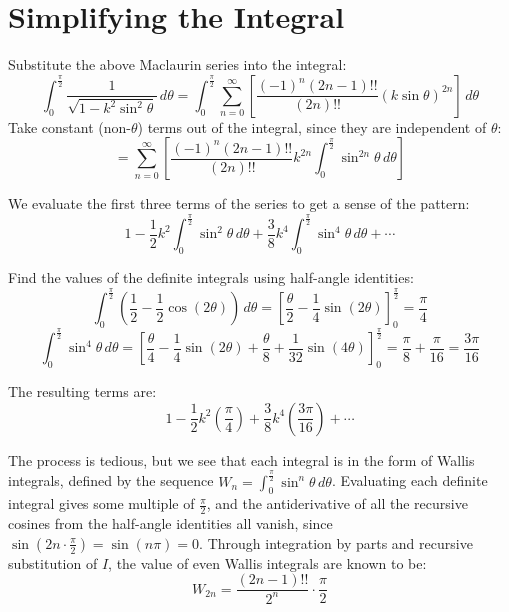 \documentclass[12pt]{article}
\begin{document}
\section{Simplifying the Integral}

Substitute the above Maclaurin series into the integral:
\[
  \int_{0}^{\frac{\pi}{2}} \frac{1}{\sqrt{1 - k^2
  \sin^2 \theta}} \, d\theta = \int_{0}^{\frac{\pi}{2}} \sum_{n=0}^{\infty} \left[\frac{(-1)^n (2n-1)!!}{(2n)!!} {\left(k\sin\theta\right)}^{2n}\right] \, d\theta
\]
Take constant (non-$\theta$) terms out of the integral, since they are independent of $\theta$:
\[
  = \sum_{n=0}^{\infty} \left[\frac{(-1)^n (2n-1)!!}{(2n)!!} k^{2n} \int_{0}^{\frac{\pi}{2}} \sin^{2n} \theta \, d\theta\right]
\]

We evaluate the first three terms of the series to get a sense of the pattern:
\[
  1 - \frac{1}{2}k^2\int_{0}^{\frac{\pi}{2}} \sin^2 \theta \, d\theta + \frac{3}{8}k^4\int_{0}^{\frac{\pi}{2}} \sin^4 \theta \, d\theta + \cdots
\]

Find the values of the definite integrals using half-angle identities:
\[
  \int_{0}^{\frac{\pi}{2}} \left(\frac{1}{2} - \frac{1}{2}\cos(2\theta)\right) \, d\theta = \left[\frac{\theta}{2} - \frac{1}{4}\sin(2\theta)\right]_{0}^{\frac{\pi}{2}} = \frac{\pi}{4}
\]
\[
  \int_{0}^{\frac{\pi}{2}} \sin^4 \theta \, d\theta = \left[\frac{\theta}{4} - \frac{1}{4}\sin(2\theta) + \frac{\theta}{8} + \frac{1}{32}\sin(4\theta)\right]_{0}^{\frac{\pi}{2}} = \frac{\pi}{8} + \frac{\pi}{16} = \frac{3\pi}{16}
\]

The resulting terms are:
\[
  1 - \frac{1}{2}k^2\left(\frac{\pi}{4}\right) + \frac{3}{8}k^4\left(\frac{3\pi}{16}\right) + \cdots
\]

The process is tedious, but we see that each integral is in the form of Wallis integrals, defined by the sequence $W_n = \int_{0}^{\frac{\pi}{2}} \sin^n \theta \, d\theta$. Evaluating each definite integral gives some multiple of $\frac{\pi}{2}$, and the antiderivative of all the recursive cosines from the half-angle identities all vanish, since $\sin(2n \cdot \frac{\pi}{2}) = \sin(n\pi) = 0$. Through integration by parts and recursive substitution of $I$, the value of even Wallis integrals are known to be:
\[
  W_{2n} = \frac{(2n-1)!!}{2^n} \cdot \frac{\pi}{2}
\]
\end{document}
